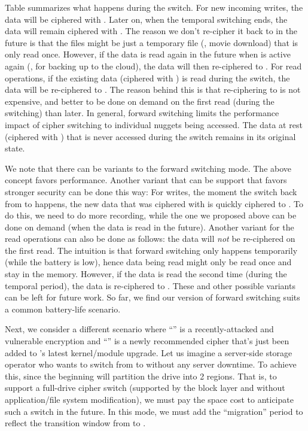 Table  summarizes what happens during the switch. For new
incoming writes, the data will be ciphered with \ctwo. Later on, when the
temporal switching ends, the data will remain ciphered with \ctwo
{}. The reason we don't re-cipher it back to \cone in the future is
that the files might be just a temporary file (\eg, movie download) that is only
read once. However, if the data is read again in the future when \cone is active
again (\eg, for backing up to the cloud), the data will then re-ciphered to
\cone. For read operations, if the existing data (ciphered with \cone) is read
during the switch, the data will be re-ciphered to \ctwo. The reason behind this
is that re-ciphering to \ctwo is not expensive, and better to be done on demand
on the first read (during the switching) than later. In general, forward
switching limits the performance impact of cipher switching to individual
nuggets being accessed. The data at rest (ciphered with \cone) that is never
accessed during the switch remains in its original state.

We note that there can be variants to the forward switching mode. The above
concept favors performance. Another variant that can be support that favors
stronger security can be done this way: For writes, the moment the switch back
from \ctwo to \cone happens, the new data that was ciphered with \ctwo is
quickly ciphered to \cone. To do this, we need to do more recording, while the
one we proposed above can be done on demand (when the data is read in the
future). Another variant for the read operations can also be done as follows:
the data will {\em not} be re-ciphered on the first read. The intuition is that
forward switching only happens temporarily (while the battery is low), hence
data being read might only be read once and stay in the memory. However, if the
data is read the second time (during the temporal period), the data is
re-ciphered to \ctwo. These and other possible variants can be left for future
work. So far, we find our version of forward switching suits a common
battery-life scenario.



 Next, we consider a different scenario where
``\cone'' is a recently-attacked and vulnerable encryption and ``\ctwo'' is a
newly recommended cipher that's just been added to \sys's latest kernel/module
upgrade. Let us imagine a server-side storage operator who wants to switch from
\cone to \ctwo without any server downtime. To achieve this, \sys since the
beginning will partition the drive into 2 regions. That is, to support a
full-drive cipher switch (supported by the block layer and without
application/file system modification), we must pay the space cost to anticipate
such a switch in the future. In this mode, we must add the ``migration'' period
to reflect the transition window from \cone to \ctwo.

